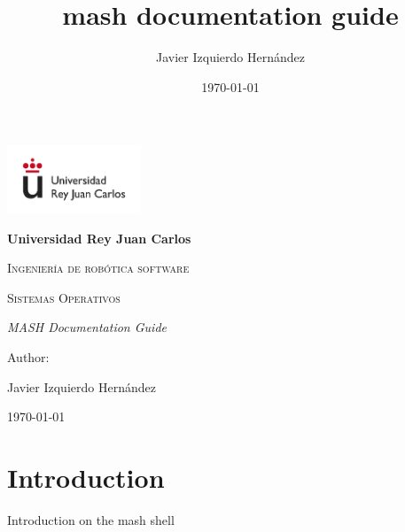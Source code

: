 \documentclass[12pt,a4paper]{report}
\title{mash documentation guide}
\author{Javier Izquierdo Hernández}
\date{\today}
\begin{document}
	\begin{titlepage}
		\centering
		{\includegraphics[width=0.3\textwidth]{logo}\par}
		\vspace{1cm}
		{\bfseries\LARGE Universidad Rey Juan Carlos \par}
		\vspace{1cm}
		{\scshape\Large Ingeniería de robótica software \par}
		\vspace{3cm}
		{\scshape\Huge Sistemas Operativos \par}
		\vspace{3cm}
		{\itshape\Large MASH Documentation Guide \par}
		\vfill
		{\Large Author: \par}
		{\Large Javier Izquierdo Hernández \par}
		\vfill
		{\Large \today \par}
	\end{titlepage}
	\newpage
	\tableofcontents
	\newpage
\part{Introduction}
Introduction on the mash shell
\end{document}
